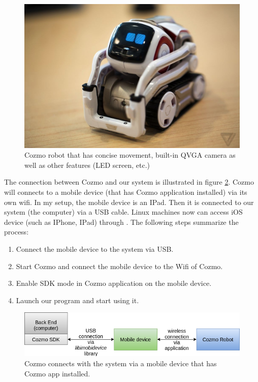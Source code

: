 \begin{figure}[!htb]
	\centering
	\includegraphics[width=0.8\hsize]{./figures/cozmo}
	\caption{Cozmo robot that has concise movement, built-in QVGA camera as well as other features (LED screen, etc.)}
	\label{fig:cozmo}
\end{figure}


The connection between Cozmo and our system is illustrated in figure \ref{fig:CozmoConnect}. Cozmo will connects to a mobile device (that has Cozmo application installed) via its own wifi. In my setup, the mobile device is an IPad. Then it is connected to our system (the computer) via a USB cable. Linux machines now can access iOS device (such as IPhone, IPad) through  \cite{libimobiledevice}. The following steps summarize the process:
\begin{enumerate}
	\item Connect the mobile device to the system via USB.
	\item Start Cozmo and connect the mobile device to the Wifi of Cozmo.
	\item Enable SDK mode in Cozmo application on the mobile device.
	\item Launch our program and start using it.
\end{enumerate}
\begin{figure}[!htb]
	\centering
	\includegraphics[width=0.9\hsize]{./figures/CozmoConnect}
	\caption{Cozmo connects with the system via a mobile device that has Cozmo app installed.}
	\label{fig:CozmoConnect}
\end{figure}


